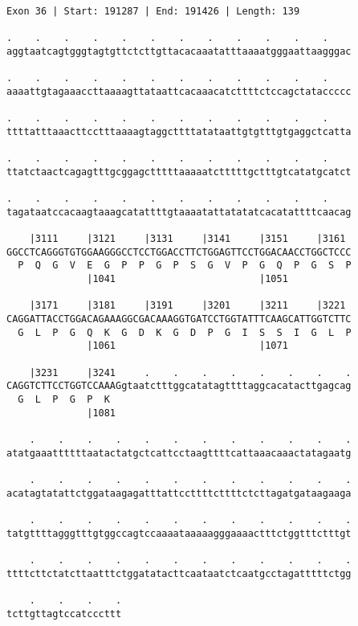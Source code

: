 \documentclass{article}
\begin{document}
\begin{Verbatim}[fontfamily=courier]
Exon 36 | Start: 191287 | End: 191426 | Length: 139

.    .    .    .    .    .    .    .    .    .    .    .    
aggtaatcagtgggtagtgttctcttgttacacaaatatttaaaatgggaattaagggac

.    .    .    .    .    .    .    .    .    .    .    .    
aaaattgtagaaaccttaaaagttataattcacaaacatcttttctccagctataccccc

.    .    .    .    .    .    .    .    .    .    .    .    
ttttatttaaacttcctttaaaagtaggcttttatataattgtgtttgtgaggctcatta

.    .    .    .    .    .    .    .    .    .    .    .    
ttatctaactcagagtttgcggagctttttaaaaatctttttgctttgtcatatgcatct

.    .    .    .    .    .    .    .    .    .    .    .    
tagataatccacaagtaaagcatattttgtaaaatattatatatcacatattttcaacag

    |3111     |3121     |3131     |3141     |3151     |3161 
GGCCTCAGGGTGTGGAAGGGCCTCCTGGACCTTCTGGAGTTCCTGGACAACCTGGCTCCC
  P  Q  G  V  E  G  P  P  G  P  S  G  V  P  G  Q  P  G  S  P
              |1041                         |1051           

    |3171     |3181     |3191     |3201     |3211     |3221 
CAGGATTACCTGGACAGAAAGGCGACAAAGGTGATCCTGGTATTTCAAGCATTGGTCTTC
  G  L  P  G  Q  K  G  D  K  G  D  P  G  I  S  S  I  G  L  P
              |1061                         |1071           

    |3231     |3241     .    .    .    .    .    .    .    .
CAGGTCTTCCTGGTCCAAAGgtaatctttggcatatagttttaggcacatacttgagcag
  G  L  P  G  P  K                                          
              |1081                                         

    .    .    .    .    .    .    .    .    .    .    .    .
atatgaaattttttaatactatgctcattcctaagttttcattaaacaaactatagaatg

    .    .    .    .    .    .    .    .    .    .    .    .
acatagtatattctggataagagatttattccttttcttttctcttagatgataagaaga

    .    .    .    .    .    .    .    .    .    .    .    .
tatgttttagggtttgtggccagtccaaaataaaaagggaaaactttctggtttctttgt

    .    .    .    .    .    .    .    .    .    .    .    .
ttttcttctatcttaatttctggatatacttcaataatctcaatgcctagatttttctgg

    .    .    .    .
tcttgttagtccatcccttt
\end{Verbatim}
\newpage
\end{document}
